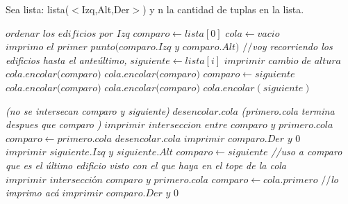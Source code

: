 \documentclass{article}
\begin{document}
Sea lista: lista($<$Izq,Alt,Der$>$) y n la cantidad de tuplas en la lista.


\vspace{0.4cm}
\begin{algorithmic}[1]
	\State $\textit{ordenar los edificios por Izq}$
	\State $comparo\gets lista[0]$
	\State $cola\gets vacio$
	\State $\textit{imprimo el primer punto(comparo.Izq y comparo.Alt)}$
	 \textit{$//$voy recorriendo los edificios hasta el anteúltimo, \color{red}{si hay 0 edificios que hago?} \color{black}}
		\State $siguiente\gets lista[i]$
				\State $\textit{imprimir cambio de altura}$
					\State $\textit{cola.encolar(comparo)}$
				\Else
					\State$\textit{cola.encolar(comparo)}$						
					\EndIf			
				\EndIf
					\State $comparo\gets siguiente$
			\EndIf
					\State $\textit{cola.encolar(comparo)}$
				\Else
					\State$\textit{cola.encolar(comparo)}$
					\EndIf			
				\EndIf
			\EndIf
				\State $cola.encolar(siguiente)$
			\EndIf
			
		\EndIf \textit{(no se intersecan comparo y siguiente\color{red}{*4})}
				\State $\textit{desencolar.cola}$
				\Else \textit{(primero.cola termina despues que comparo \color{red}{*6})}
				\State $\textit{imprimir interseccion entre comparo y primero.cola}$
				\State $comparo\gets primero.cola$
				\State $\textit{desencolar.cola}$
				\EndIf
			\EndWhile
		\State $\textit{imprimir comparo.Der y 0 }$
		\State $\textit{imprimir siguiente.Izq y siguiente.Alt}$
		\State $comparo\gets siguiente$
		\EndIf
	\textit{//uso a comparo que es el último edificio visto con el que haya en el tope de la cola}
		\State $\textit{imprimir intersección comparo y primero.cola}$
		\State $comparo\gets cola.primero$
	\EndIf
	\newline
	\textit{$//$lo imprimo acá}
	\State $\textit{imprimir comparo.Der y 0}$
\EndProcedure
\end{algorithmic}
\end{document}
